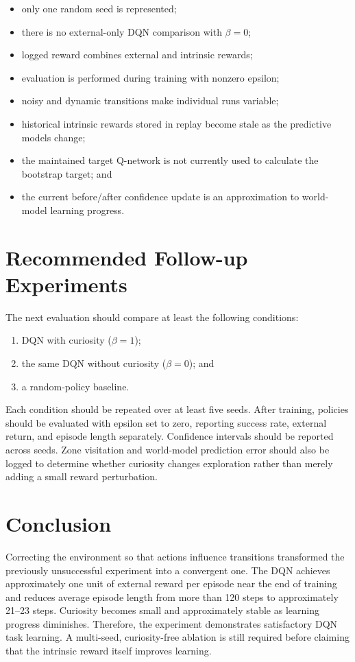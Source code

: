 \documentclass[11pt,a4paper]{article}
\begin{document}
\begin{itemize}
    \item only one random seed is represented;
    \item there is no external-only DQN comparison with $\beta=0$;
    \item logged reward combines external and intrinsic rewards;
    \item evaluation is performed during training with nonzero epsilon;
    \item noisy and dynamic transitions make individual runs variable;
    \item historical intrinsic rewards stored in replay become stale as the
          predictive models change;
    \item the maintained target Q-network is not currently used to calculate
          the bootstrap target; and
    \item the current before/after confidence update is an approximation to
          world-model learning progress.
\end{itemize}

\section{Recommended Follow-up Experiments}

The next evaluation should compare at least the following conditions:

\begin{enumerate}
    \item DQN with curiosity ($\beta=1$);
    \item the same DQN without curiosity ($\beta=0$); and
    \item a random-policy baseline.
\end{enumerate}

Each condition should be repeated over at least five seeds. After training,
policies should be evaluated with epsilon set to zero, reporting success rate,
external return, and episode length separately. Confidence intervals should be
reported across seeds. Zone visitation and world-model prediction error should
also be logged to determine whether curiosity changes exploration rather than
merely adding a small reward perturbation.

\section{Conclusion}

Correcting the environment so that actions influence transitions transformed
the previously unsuccessful experiment into a convergent one. The DQN achieves
approximately one unit of external reward per episode near the end of training
and reduces average episode length from more than 120 steps to approximately
21--23 steps. Curiosity becomes small and approximately stable as learning
progress diminishes. Therefore, the experiment demonstrates satisfactory DQN
task learning. A multi-seed, curiosity-free ablation is still required before
claiming that the intrinsic reward itself improves learning.
\end{document}
